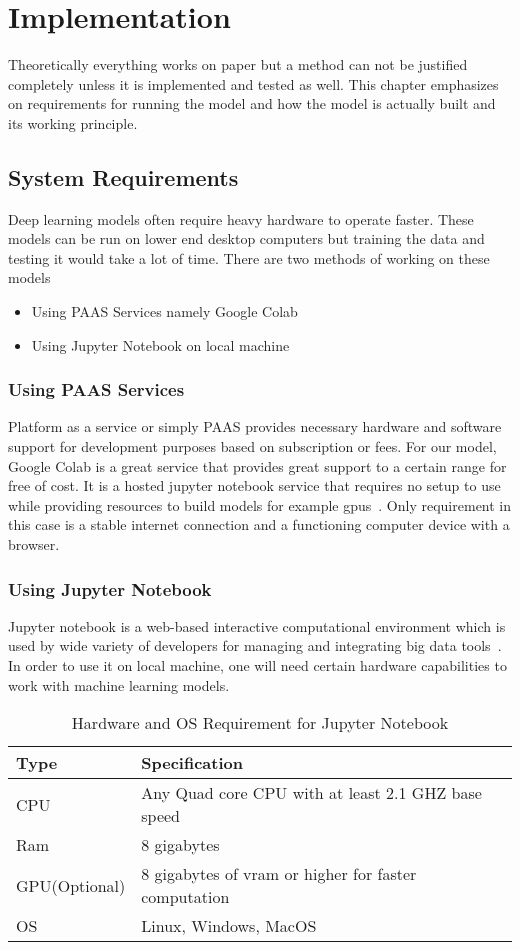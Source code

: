 \chapter{Implementation} \label{ch:implementation}
Theoretically everything works on paper but a method can not be justified completely unless it is implemented and tested as well. This chapter emphasizes on requirements for running the model and how the model is actually built and its working principle.

\section{System Requirements}
Deep learning models often require heavy hardware to operate faster. These models can be run on lower end desktop computers but training the data and testing it would take a lot of time. There are two methods of working on these models
\begin{itemize}
\item Using PAAS Services namely Google Colab
\item Using Jupyter Notebook on local machine
\end{itemize} 
\subsection{Using PAAS Services}
Platform as a service or simply PAAS provides necessary hardware and software support for development purposes based on subscription or fees. For our model, Google Colab is a great service that provides great support to a certain range for free of cost. It is a hosted jupyter notebook service that requires no setup to use while providing resources to build models for example gpus~\cite{url1}. Only requirement in this case is a stable internet connection and a functioning computer device with a browser.
\subsection{Using Jupyter Notebook}
Jupyter notebook is a web-based interactive computational environment which is used by wide variety of developers for managing and integrating big data tools~\cite{url2}. In order to use it on local machine, one will need certain hardware capabilities to work with machine learning models.
\begin{table}
\centering
\begin{tabular}{|l|l|}
\hline
Type & Specification \\
\hline
CPU & Any Quad core CPU with at least 2.1 GHZ base speed \\
\hline
Ram & 8 gigabytes \\
\hline
GPU(Optional) & 8 gigabytes of vram or higher for faster computation \\
\hline
OS & Linux, Windows, MacOS \\
\hline
\end{tabular}
\caption{Hardware and OS Requirement for Jupyter Notebook}
\end{table}


